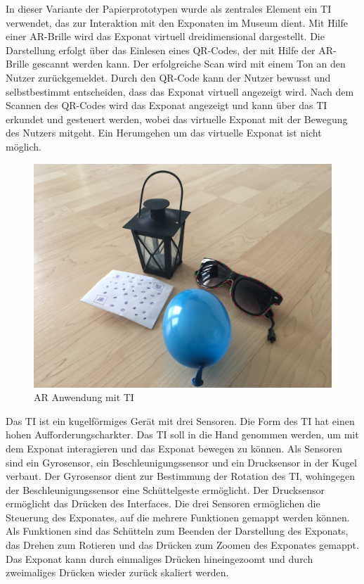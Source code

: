 \documentclass[runningheads,a4paper, 12pt]{llncs}
\begin{document}
In dieser Variante der Papierprototypen wurde als zentrales Element ein TI verwendet, das zur Interaktion mit den Exponaten im Museum dient. Mit Hilfe einer AR-Brille wird das Exponat virtuell dreidimensional dargestellt. Die Darstellung erfolgt über das Einlesen eines QR-Codes, der mit Hilfe der AR-Brille gescannt werden kann. Der erfolgreiche Scan wird mit einem Ton an den Nutzer zurückgemeldet. Durch den QR-Code kann der Nutzer bewusst und selbstbestimmt entscheiden, dass das Exponat virtuell angezeigt wird. Nach dem Scannen des QR-Codes wird das Exponat angezeigt und kann über das TI erkundet und gesteuert werden, wobei das virtuelle Exponat mit der Bewegung des Nutzers mitgeht. Ein Herumgehen um das virtuelle Exponat ist nicht möglich.\\ 

\begin{figure}[H]
	\centering
	\includegraphics[angle=0,scale=0.04]{proto2}
	\caption{AR Anwendung mit TI}
	\label{fig:prototype2}
\end{figure}

Das TI ist ein kugelförmiges Gerät mit drei Sensoren. Die Form des TI hat einen hohen Aufforderungscharkter. Das TI soll in die Hand genommen werden, um mit dem Exponat interagieren und das Exponat bewegen zu können. Als Sensoren sind ein Gyrosensor, ein Beschleunigungssensor und ein Drucksensor in der Kugel verbaut. Der Gyrosensor dient zur Bestimmung der Rotation des TI, wohingegen der Beschleunigungssensor eine Schüttelgeste ermöglicht. Der Drucksensor ermöglicht das Drücken des Interfaces. Die drei Sensoren ermöglichen die Steuerung des Exponates, auf die mehrere Funktionen gemappt werden können. Als Funktionen sind das Schütteln zum Beenden der Darstellung des Exponats, das Drehen zum Rotieren und das Drücken zum Zoomen des Exponates gemappt. Das Exponat kann durch einmaliges Drücken hineingezoomt und durch zweimaliges Drücken wieder zurück skaliert werden.\\ 
\end{document}
